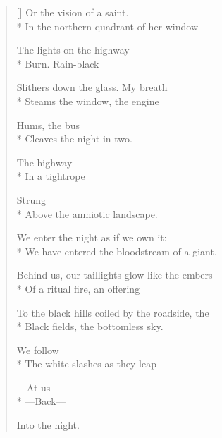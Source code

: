 \begin{verse}[\versewidth]
Or the vision of a saint.\\*
In the northern quadrant of her window

The lights on the highway\\*
Burn. \quad Rain-black

Slithers down the glass. \quad My breath\\*
Steams the window, the engine

Hums, the bus\\*
Cleaves the night in two.

The highway\\*
In a tightrope

Strung\\*
Above the amniotic landscape.

We enter the night as if we own it:\\*
We have entered the bloodstream of a giant.

Behind us, our taillights glow like the embers\\*
Of a ritual fire, an offering

To the black hills coiled by the roadside, the\\*
Black fields, the bottomless sky.

We follow\\*
The white slashes as they leap

---At us---\\*
---Back---

Into the night.
\end{verse}
